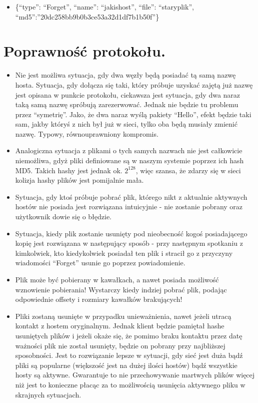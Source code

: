 \documentclass[10pt,a4paper]{article}
\begin{document}
\begin{itemize}
\begin{itemize}
\item \{“type”: “Forget”, “name”: “jakishost”, “file”: “staryplik”, “md5”:”20dc258bb9b0b3ce53a32d1df7b1b50f”\}
\end{itemize}
\end{itemize}
\section{Poprawność protokołu.}
\begin{itemize}
\item Nie jest możliwa sytuacja, gdy dwa węzły będą posiadać tą samą nazwę hosta. Sytuacja, gdy dołącza się taki, który próbuje uzyskać zajętą już nazwę jest opisana w punkcie protokołu, ciekawsza jest sytuacja, gdy dwa naraz taką samą nazwę spróbują zarezerwować. Jednak nie będzie tu problemu przez “symetrię”. Jako, że dwa naraz wyślą pakiety “Hello”, efekt będzie taki sam, jakby któryś z nich był już w sieci, tylko oba będą musiały zmienić nazwę. Typowy, równouprawniony kompromis.
\item Analogiczna sytuacja z plikami o tych samych nazwach nie jest
całkowicie niemożliwa, gdyż pliki definiowane są w naszym systemie poprzez
ich hash MD5. Takich hashy jest jednak ok. $2^{128}$, więc szansa,
że zdarzy się w sieci kolizja hashy plików jest pomijalnie mała. 
\item Sytuacja, gdy ktoś próbuje pobrać plik, którego nikt z aktualnie aktywnych hostów nie posiada jest rozwiązana intuicyjnie - nie zostanie pobrany oraz użytkownik dowie się o błędzie.
\item Sytuacja, kiedy plik zostanie usunięty pod nieobecność kogoś
posiadającego kopię jest rozwiązana w następujący sposób - 
przy następnym spotkaniu z kimkolwiek, kto kiedykolwiek posiadał ten plik 
i stracił go z przyczyny wiadomości “Forget”  usunie go poprzez
powiadomienie.
\item Plik może być pobierany w kawałkach, a nawet posiada możliwość wznowienie pobierania! Wystarczy kiedy indziej pobrać plik, podając odpowiednie offsety i rozmiary kawałków brakujących!
\item Pliki zostaną usunięte w przypadku unieważnienia, nawet jeżeli utracą kontakt z hostem oryginalnym. Jednak klient będzie pamiętał hashe usuniętych plików i jeżeli okaże się, że pomimo braku kontaktu przez datę ważności plik nie został usunięty, będzie on pobrany przy najbliższej sposobności. Jest to rozwiązanie lepsze w sytuacji, gdy sieć jest duża bądź pliki są popularne (większość jest na dużej ilości hostów) bądź wszystkie hosty są aktywne. Gwarantuje to nie przechowywanie martwych plików więcej niż jest to konieczne płacąc za to możliwością usunięcia aktywnego pliku w skrajnych sytuacjach.
\end{itemize}
\end{document}
